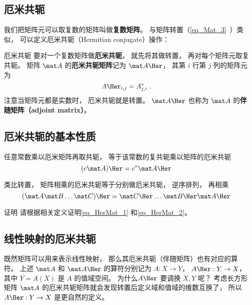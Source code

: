 

\subsection{厄米共轭}
我们把矩阵元可以取复数的矩阵叫做\textbf{复数矩阵}。 %
与矩阵转置（\autoref{eq_Mat_3}~）类似， 可以定义厄米共轭（Hermitian conjugate）操作：

\begin{definition}{厄米共轭}
要对一个复数矩阵做\textbf{厄米共轭}， 就先将其做转置， 再对每个矩阵元取复共轭。 矩阵 $\mat A$ 的\textbf{厄米共轭矩阵}记为 $\mat A\Her$， 其第 $i$ 行第 $j$ 列的矩阵元为
\begin{equation}
A\Her_{i,j} = A_{j,i}^*~.
\end{equation}
注意当矩阵元都是实数时， 厄米共轭就是转置。 $\mat A\Her$ 也称为 $\mat A$ 的\textbf{伴随矩阵（adjoint matrix）}。
\end{definition}

\subsection{厄米共轭的基本性质}
任意常数乘以厄米矩阵再取共轭， 等于该常数的复共轭乘以矩阵的厄米共轭
\begin{equation}\label{eq_HerMat_1}
(c \mat A)\Her = c^* \mat A\Her
\end{equation}

类比转置，%
矩阵相乘的厄米共轭等于分别做厄米共轭， 逆序排列， 再相乘
\begin{equation}\label{eq_HerMat_2}
(\mat A \mat B \dots \mat C)\Her  = \mat C\Her \dots \mat B\Her \mat A\Her
\end{equation}

\begin{exercise}{证明}
请根据相关定义证明\autoref{eq_HerMat_1} 和\autoref{eq_HerMat_2}。
\end{exercise}

\subsection{线性映射的厄米共轭}
既然矩阵可以用来表示线性映射， 那么其厄米共轭（伴随矩阵）也有对应的算符。 上述 $\mat A$ 和 $\mat A\Her$ 的算符分别记为 $A:X\to Y$， $A\Her: Y\to X$， 其中 $Y = A(X)$ 是 $A$ 的值域空间。 为什么$A\Her$ 要调换 $X, Y$ 呢？ 考虑长方形矩阵 $\mat A$ 的厄米共轭矩阵就会发现转置后定义域和值域的维数互换了， 所以 $A\Her:Y\to X$ 是更自然的定义。

